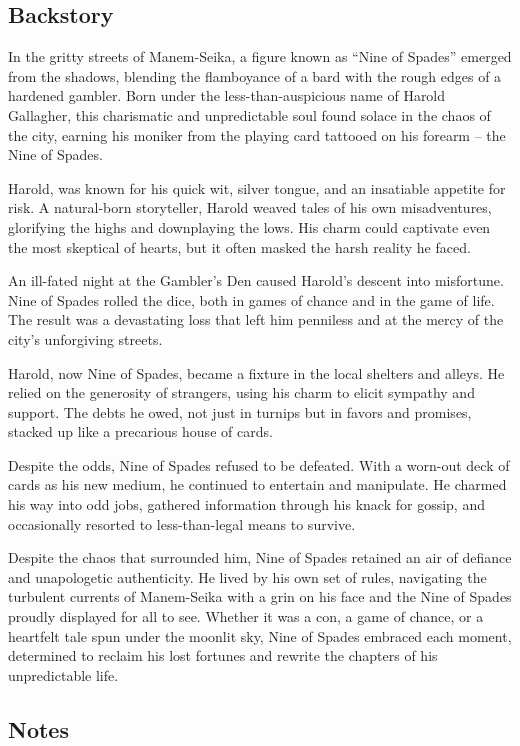 \documentclass[11pt]{article}
\begin{document}
\subsection{Backstory}
\label{sec:orge71abd9}
In the gritty streets of Manem-Seika, a figure known as ``Nine of Spades'' emerged from the shadows, blending the flamboyance of a bard with the rough edges of a hardened gambler. Born under the less-than-auspicious name of Harold Gallagher, this charismatic and unpredictable soul found solace in the chaos of the city, earning his moniker from the playing card tattooed on his forearm – the Nine of Spades.

Harold, was known for his quick wit, silver tongue, and an insatiable appetite for risk. A natural-born storyteller, Harold weaved tales of his own misadventures, glorifying the highs and downplaying the lows. His charm could captivate even the most skeptical of hearts, but it often masked the harsh reality he faced.

An ill-fated night at the Gambler's Den caused Harold's descent into misfortune. Nine of Spades rolled the dice, both in games of chance and in the game of life. The result was a devastating loss that left him penniless and at the mercy of the city's unforgiving streets.

Harold, now Nine of Spades, became a fixture in the local shelters and alleys. He relied on the generosity of strangers, using his charm to elicit sympathy and support. The debts he owed, not just in turnips but in favors and promises, stacked up like a precarious house of cards.

Despite the odds, Nine of Spades refused to be defeated. With a worn-out deck of cards as his new medium, he continued to entertain and manipulate. He charmed his way into odd jobs, gathered information through his knack for gossip, and occasionally resorted to less-than-legal means to survive.

Despite the chaos that surrounded him, Nine of Spades retained an air of defiance and unapologetic authenticity. He lived by his own set of rules, navigating the turbulent currents of Manem-Seika with a grin on his face and the Nine of Spades proudly displayed for all to see. Whether it was a con, a game of chance, or a heartfelt tale spun under the moonlit sky, Nine of Spades embraced each moment, determined to reclaim his lost fortunes and rewrite the chapters of his unpredictable life.
\subsection{Notes}
\label{sec:org480b2fa}
\end{document}

